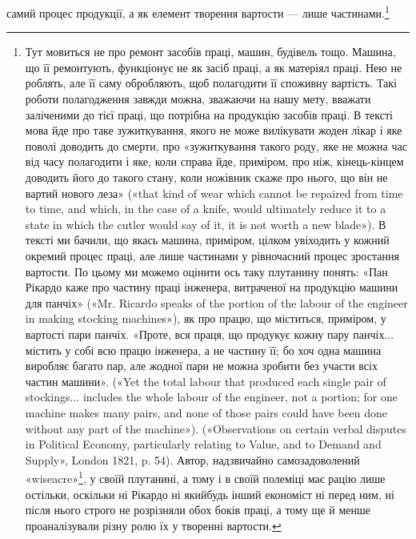 \parcont{}  %
самий процес продукції, а як елемент творення вартости — лише
частинами.\footnote{
Тут мовиться не про ремонт засобів праці, машин, будівель тощо.
Машина, що її ремонтують, функціонує не як засіб праці, а як матеріял
праці. Нею не роблять, але її саму обробляють, щоб полагодити її споживну
вартість. Такі роботи полагодження завжди можна, зважаючи
на нашу мету, вважати заліченими до тієї праці, що потрібна на продукцію
засобів праці. В тексті мова йде про таке зужиткування, якого не може
вилікувати жоден лікар і яке поволі доводить до смерти, про «зужиткування
такого роду, яке не можна час від часу полагодити і яке, коли справа
йде, приміром, про ніж, кінець-кінцем доводить його до такого стану,
коли ножівник скаже про нього, що він не вартий нового леза» («that
kind of wear which cannot be repaired from time to time, and which, in the
case of a knife, would ultimately reduce it to a state in which the cutler
would say of it, it is not worth a new blade»). В тексті ми бачили, що якась
машина, приміром, цілком увіходить у кожний окремий процес праці,
але лише частинами у рівночасний процес зростання вартости. По цьому
ми можемо оцінити ось таку плутанину понять: «Пан Рікардо каже про
частину праці інженера, витраченої на продукцію машини для панчіх»
(«Mr. Ricardo speaks of the portion of the labour of the engineer in making
stocking machines»), як про працю, що міститься, приміром, у вартості
пари панчіх. «Проте, вся праця, що продукує кожну пару панчіх... містить
у собі всю працю інженера, а не частину її; бо хоч одна машина виробляє
багато пар, але жодної пари не можна зробити без участи всіх частин
машини». («Yet the total labour that produced each single pair of stockings...
includes the whole labour of the engineer, not a portion; for one
machine makes many pairs, and none of those pairs could have been done
without any part of the machine»). («Observations on certain verbal disputes
in Political Economy, particularly relating to Value, and to Demand and
Supply», London 1821, p. 54). Автор, надзвичайно самозадоволений
«wiseacre»\footnote*{
— удаваний мудрак, самозадоволений дурень. Ред.
}, у своїй плутанині, а тому і в своїй полеміці має рацію лише
остільки, оскільки ні Рікардо ні якийбудь інший економіст ні перед
ним, ні після нього строго не розрізняли обох боків праці, а тому ще
й менше проаналізували різну ролю їх у творенні вартости.
}

